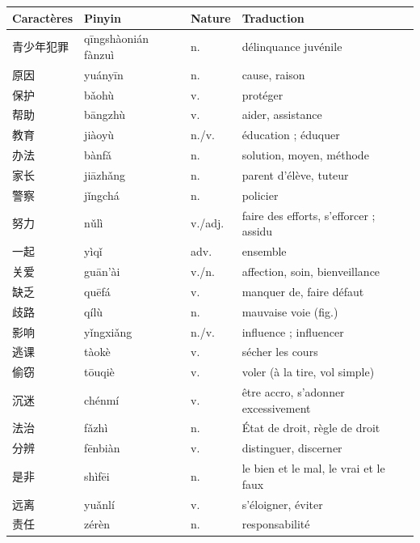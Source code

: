 \documentclass[11pt]{article}
\begin{document}
\begin{center}
\begin{tabularx}{\linewidth}{|X|X|X|X|}
\hline
\rowcolor{popblueL} Caractères & Pinyin & Nature & Traduction \\
\hline
青少年犯罪 & qīngshàonián fànzuì & n. & délinquance juvénile \\
\hline
原因 & yuányīn & n. & cause, raison \\
\hline
保护 & bǎohù & v. & protéger \\
\hline
帮助 & bāngzhù & v. & aider, assistance \\
\hline
教育 & jiàoyù & n./v. & éducation ; éduquer \\
\hline
办法 & bànfǎ & n. & solution, moyen, méthode \\
\hline
家长 & jiāzhǎng & n. & parent d'élève, tuteur \\
\hline
警察 & jǐngchá & n. & policier \\
\hline
努力 & nǔlì & v./adj. & faire des efforts, s'efforcer ; assidu \\
\hline
一起 & yìqǐ & adv. & ensemble \\
\hline
关爱 & guān'ài & v./n. & affection, soin, bienveillance \\
\hline
缺乏 & quēfá & v. & manquer de, faire défaut \\
\hline
歧路 & qílù & n. & mauvaise voie (fig.) \\
\hline
影响 & yǐngxiǎng & n./v. & influence ; influencer \\
\hline
逃课 & tàokè & v. & sécher les cours \\
\hline
偷窃 & tōuqiè & v. & voler (à la tire, vol simple) \\
\hline
沉迷 & chénmí & v. & être accro, s'adonner excessivement \\
\hline
法治 & fǎzhì & n. & État de droit, règle de droit \\
\hline
分辨 & fēnbiàn & v. & distinguer, discerner \\
\hline
是非 & shìfēi & n. & le bien et le mal, le vrai et le faux \\
\hline
远离 & yuǎnlí & v. & s'éloigner, éviter \\
\hline
责任 & zérèn & n. & responsabilité \\
\hline
\end{tabularx}
\end{center}
\end{document}
